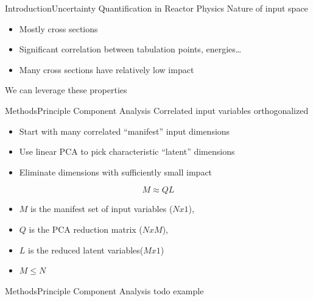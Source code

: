 \documentclass{beamer}
\begin{document}
\begin{frame}{Introduction}{Uncertainty Quantification in Reactor Physics}\vspace{-30pt}
  Nature of input space
  \begin{itemize}
    \item Mostly cross sections
    \item Significant correlation between tabulation points, energies\dots
    \item Many cross sections have relatively low impact
  \end{itemize}
  \vspace{15pt}
  We can leverage these properties
\end{frame}



\begin{frame}{Methods}{Principle Component Analysis}%
  Correlated input variables orthogonalized
  \begin{itemize}
    \item Start with many correlated ``manifest'' input dimensions
    \item Use linear PCA to pick characteristic ``latent'' dimensions
    \item Eliminate dimensions with sufficiently small impact
  \end{itemize}
  \vspace{5pt}
  \begin{equation}
    M \approx Q L
  \end{equation}
  \vspace{-5pt}
  \begin{itemize}
    \item $M$ is the manifest set of input variables ($Nx1$),
    \item $Q$ is the PCA reduction matrix ($NxM$),
    \item $L$ is the reduced latent variables($Mx1$)
    \item $M \leq N$
  \end{itemize}
\end{frame}

\begin{frame}{Methods}{Principle Component Analysis}\vspace{-30pt}
  todo example
\end{frame}
\end{document}
